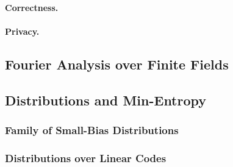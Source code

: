 \paragraph{Correctness.}

\paragraph{Privacy.}

\subsection{Fourier Analysis over Finite Fields}\label{sec:prelim-fourier}

\subsection{Distributions and Min-Entropy}\label{sec:prelim-min-ent}

\subsubsection{Family of Small-Bias Distributions}\label{sec:prelim-small-bias}

\subsubsection{Distributions over Linear Codes}\label{sec:prelim-codes}





